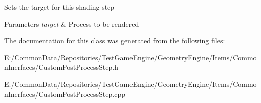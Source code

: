 Sets the target for this shading step 
\begin{DoxyParams}{Parameters}
{\em target} & Process to be rendered \\
\hline
\end{DoxyParams}


The documentation for this class was generated from the following files\+:\begin{DoxyCompactItemize}
\item 
E\+:/\+Common\+Data/\+Repositories/\+Test\+Game\+Engine/\+Geometry\+Engine/\+Items/\+Common\+Inerfaces/Custom\+Post\+Process\+Step.\+h\item 
E\+:/\+Common\+Data/\+Repositories/\+Test\+Game\+Engine/\+Geometry\+Engine/\+Items/\+Common\+Inerfaces/Custom\+Post\+Process\+Step.\+cpp\end{DoxyCompactItemize}
